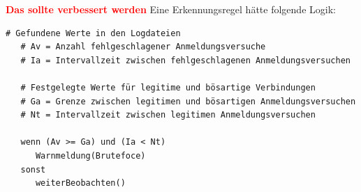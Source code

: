 






\textbf{\textcolor{red}{Das sollte verbessert werden}}
Eine Erkennungsregel hätte folgende Logik:
{
\begin{Verbatim}[frame=single]
   # Gefundene Werte in den Logdateien
   # Av = Anzahl fehlgeschlagener Anmeldungsversuche
   # Ia = Intervallzeit zwischen fehlgeschlagenen Anmeldungsversuchen

   # Festgelegte Werte für legitime und bösartige Verbindungen
   # Ga = Grenze zwischen legitimen und bösartigen Anmeldungsversuchen
   # Nt = Intervallzeit zwischen legitimen Anmeldungsversuchen

   wenn (Av >= Ga) und (Ia < Nt)
      Warnmeldung(Brutefoce)
   sonst
      weiterBeobachten()
\end{Verbatim}
}




